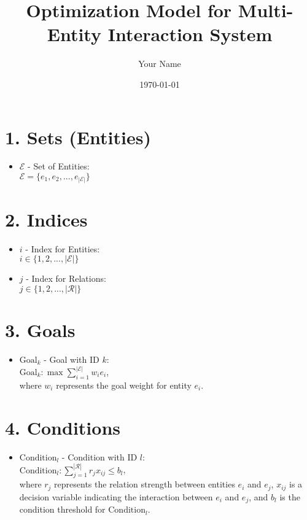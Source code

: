 \documentclass{article}
\title{Optimization Model for Multi-Entity Interaction System}
\author{Your Name}
\date{\today}
\begin{document}
\maketitle
\tableofcontents

\section{1. Sets (Entities)}
\begin{itemize}[leftmargin=*]
    \item $\mathcal{E}$ - Set of Entities: \\ $\mathcal{E} = \{e_1, e_2, ..., e_{|\mathcal{E}|}\}$
\end{itemize}

\section{2. Indices}
\begin{itemize}[leftmargin=*]
    \item $i$ - Index for Entities: \\ $i \in \{1, 2, ..., |\mathcal{E}|\}$
    \item $j$ - Index for Relations: \\ $j \in \{1, 2, ..., |\mathcal{R}|\}$
\end{itemize}

\section{3. Goals}
\begin{itemize}[leftmargin=*]
    \item $\text{Goal}_k$ - Goal with ID $k$: \\
    $\text{Goal}_{k}: \max \sum_{i=1}^{|\mathcal{E}|} w_i e_i$, \\
    where $w_i$ represents the goal weight for entity $e_i$.
\end{itemize}

\section{4. Conditions}
\begin{itemize}[leftmargin=*]
    \item $\text{Condition}_{l}$ - Condition with ID $l$: \\
    $\text{Condition}_{l}: \sum_{j=1}^{|\mathcal{R}|} r_j x_{ij} \leq b_l$, \\
    where $r_j$ represents the relation strength between entities $e_i$ and $e_j$, $x_{ij}$ is a decision variable indicating the interaction between $e_i$ and $e_j$, and $b_l$ is the condition threshold for $\text{Condition}_l$.
\end{itemize}
\end{document}
